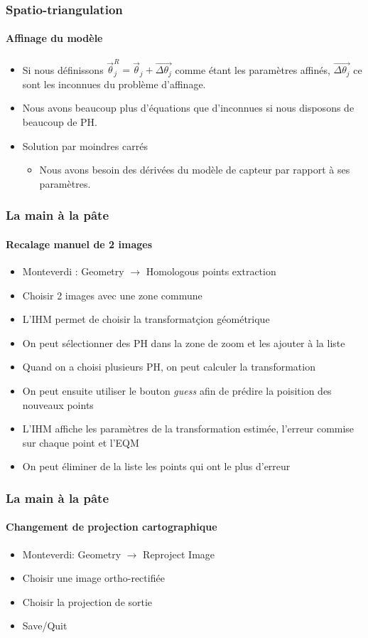 \documentclass[compress]{beamer}
\begin{document}
\begin{frame}
  \frametitle{Spatio-triangulation}
  \framesubtitle{Affinage du modèle}
  \begin{itemize}
    \item Si nous définissons $\vec\theta_j^R = \vec\theta_j +
    \vec{\Delta\theta_j}$ comme étant les paramètres affinés,
    $\vec{\Delta\theta_j}$ ce sont les inconnues du problème d'affinage.
    \item Nous avons beaucoup plus d'équations que d'inconnues si nous
      disposons de beaucoup de PH.
    \item Solution par moindres carrés
      \begin{itemize}
	\item Nous avons besoin des dérivées du modèle de capteur par
          rapport à ses paramètres.
      \end{itemize}
  \end{itemize}
  
\end{frame}

\begin{frame}
  \frametitle{La main à la pâte}
  \framesubtitle{Recalage manuel de 2 images}
\vspace*{-0.6cm}
\small
  \begin{itemize}
  \item Monteverdi : Geometry $\rightarrow$ Homologous points extraction
  \item Choisir 2 images avec une zone commune
  \item L'IHM permet de choisir la transformatçion géométrique
  \item On peut sélectionner des PH dans la zone de zoom et les
    ajouter à la liste
  \item Quand on a choisi plusieurs PH, on peut calculer la transformation
  \item On peut ensuite utiliser le bouton {\em guess} afin de prédire
    la poisition des nouveaux points
  \item L'IHM affiche les paramètres de la transformation estimée,
    l'erreur commise sur chaque point et l'EQM
  \item On peut éliminer de la liste les points qui ont le plus d'erreur
  \end{itemize}
\end{frame}



\begin{frame}
  \frametitle{La main à la pâte}
  \framesubtitle{Changement de projection cartographique}
  \begin{itemize}
  \item Monteverdi: Geometry $\rightarrow$ Reproject Image
  \item Choisir une image ortho-rectifiée
  \item Choisir la projection de sortie
  \item Save/Quit
  \end{itemize}
\end{frame}
\end{document}
